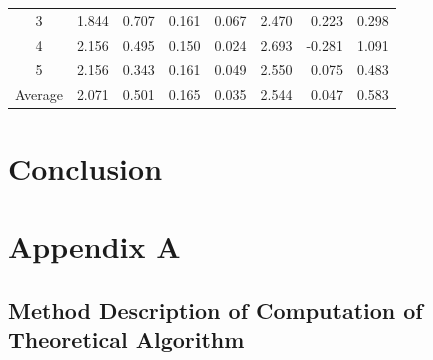 \begin{table}[!h]
\begin{tabular}{c|r|r|r|r|r|r|r}
3                                            & 1.844                            & 0.707                            & 0.161                                                                         & 0.067                                                                        & 2.470                            & 0.223                            & 0.298                                                                        \\
4                                            & 2.156                            & 0.495                            & 0.150                                                                         & 0.024                                                                        & 2.693                            & -0.281                           & 1.091                                                                        \\
5                                            & 2.156                            & 0.343                            & 0.161                                                                         & 0.049                                                                        & 2.550                            & 0.075                            & 0.483                                                                        \\
Average                                      & 2.071                            & 0.501                            & 0.165                                                                         & 0.035                                                                        & 2.544                            & 0.047                            & 0.583                                                                       
\end{tabular}
\egroup
\end{table}
\newpage
\section{Conclusion}


\newpage

\section{Appendix A}
\subsection{Method Description of Computation of Theoretical Algorithm}

